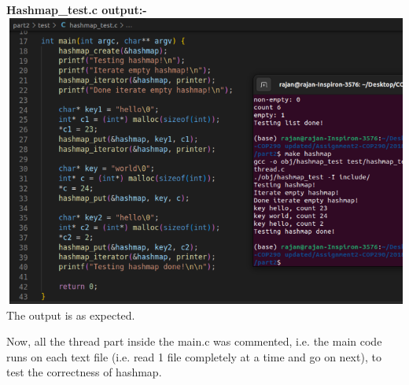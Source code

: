 \documentclass[12pt]{article}
\begin{document}
\begin{spacing}{1.2}
    \newpage


\textbf{Hashmap\_test.c output:-}\\
\includegraphics[width=20cm]{images/8.png}\\
The output is as expected.\\

\newpage

Now, all the thread part inside the main.c was commented, i.e. the main code runs on each text file (i.e. read 1 file completely at a time and go on next), to test the correctness of hashmap.\\


\end{spacing}
\end{document}
